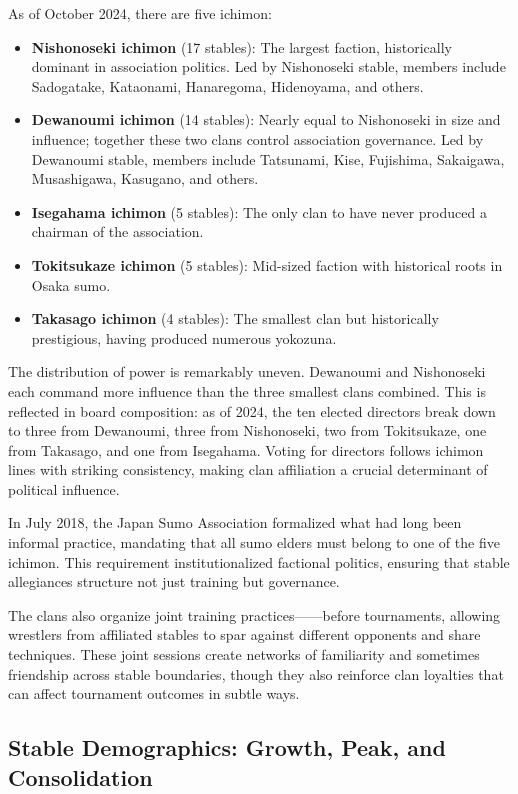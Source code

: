 As of October 2024, there are five ichimon:

\begin{itemize}
\item \textbf{Nishonoseki ichimon} (17 stables): The largest faction, historically dominant in association politics. Led by Nishonoseki stable, members include Sadogatake, Kataonami, Hanaregoma, Hidenoyama, and others.
\item \textbf{Dewanoumi ichimon} (14 stables): Nearly equal to Nishonoseki in size and influence; together these two clans control association governance. Led by Dewanoumi stable, members include Tatsunami, Kise, Fujishima, Sakaigawa, Musashigawa, Kasugano, and others.
\item \textbf{Isegahama ichimon} (5 stables): The only clan to have never produced a chairman of the association.
\item \textbf{Tokitsukaze ichimon} (5 stables): Mid-sized faction with historical roots in Osaka sumo.
\item \textbf{Takasago ichimon} (4 stables): The smallest clan but historically prestigious, having produced numerous yokozuna.
\end{itemize}

The distribution of power is remarkably uneven. Dewanoumi and Nishonoseki each command more influence than the three smallest clans combined. This is reflected in board composition: as of 2024, the ten elected directors break down to three from Dewanoumi, three from Nishonoseki, two from Tokitsukaze, one from Takasago, and one from Isegahama. Voting for directors follows ichimon lines with striking consistency, making clan affiliation a crucial determinant of political influence.

In July 2018, the Japan Sumo Association formalized what had long been informal practice, mandating that all sumo elders must belong to one of the five ichimon. This requirement institutionalized factional politics, ensuring that stable allegiances structure not just training but governance.

The clans also organize joint training practices——before tournaments, allowing wrestlers from affiliated stables to spar against different opponents and share techniques. These joint sessions create networks of familiarity and sometimes friendship across stable boundaries, though they also reinforce clan loyalties that can affect tournament outcomes in subtle ways.

\subsection{Stable Demographics: Growth, Peak, and Consolidation}

